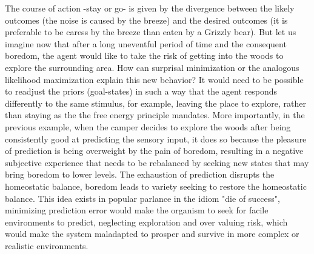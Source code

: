 \documentclass[11pt, onecolumn]{article}
\begin{document}
The course of action -stay or go- is given by the divergence between the likely outcomes (the noise is caused by the breeze) and the desired outcomes (it is preferable to be caress by the breeze than eaten by a Grizzly bear). But let us imagine now that after a long uneventful period of time and the consequent boredom, the agent would like to take the risk of getting into the woods to explore the surrounding area. 
How can surprisal minimization or the analogous likelihood maximization explain this new behavior? It would need to be possible to readjust the priors (goal-states) in such a way that the agent responds differently to the same stimulus, for example, leaving the place to explore, rather than staying as the the free energy principle mandates. 
More importantly, in the previous example, when the camper decides to explore the woods after being consistently good at predicting the sensory input, it does so because the pleasure of prediction is being overweight by the pain of boredom, resulting in a negative subjective experience that needs to be rebalanced by seeking new states that may bring boredom to lower levels. 
The exhaustion of prediction disrupts the homeostatic balance, boredom leads to variety seeking to restore the homeostatic balance. This idea exists in popular parlance in the idiom "die of success", minimizing prediction error would make the organism to seek for facile environments to predict, neglecting exploration and over valuing risk, which would make the system maladapted to prosper and survive in more complex or realistic environments. 
\end{document}
